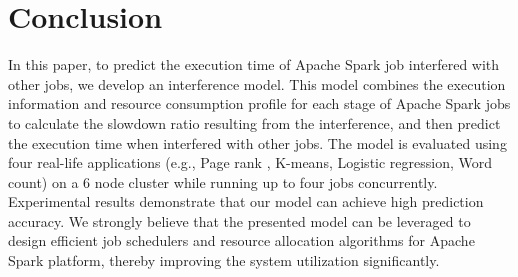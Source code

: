 \section{Conclusion}
\label{conclusion}
In this paper, to predict the execution time of Apache Spark job interfered with other jobs, we develop an interference model. This model combines the execution information and resource consumption profile for each stage of Apache Spark jobs to calculate the slowdown ratio resulting from the interference, and then predict the execution time when interfered with other jobs. The model is evaluated using four real-life applications (e.g., Page rank , K-means, Logistic regression, Word count) on a 6 node cluster while running up to four jobs concurrently. Experimental results demonstrate that our model can achieve high prediction accuracy. We strongly believe that the presented model can be leveraged to design efficient job schedulers and resource allocation algorithms for Apache Spark platform, thereby improving the system utilization significantly. 

